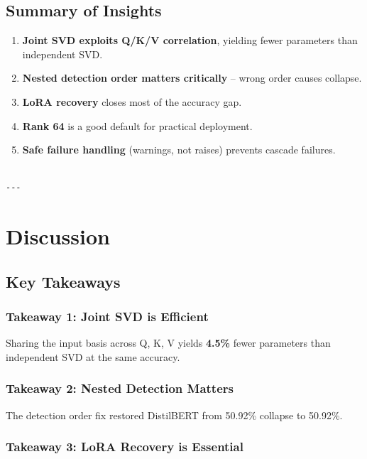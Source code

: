 \subsection{Summary of Insights}

\begin{enumerate}
\item \textbf{Joint SVD exploits Q/K/V correlation}, yielding fewer parameters than
  independent SVD.
\item \textbf{Nested detection order matters critically} -- wrong order causes collapse.
\item \textbf{LoRA recovery} closes most of the accuracy gap.
\item \textbf{Rank 64} is a good default for practical deployment.
\item \textbf{Safe failure handling} (warnings, not raises) prevents cascade failures.
\end{enumerate}
\begin{lstlisting}

---
\end{lstlisting}

\section{Discussion}

\subsection{Key Takeaways}

\subsubsection{Takeaway 1: Joint SVD is Efficient}

Sharing the input basis across Q, K, V yields \textbf{4.5\%} fewer 
parameters than independent SVD at the same accuracy.

\subsubsection{Takeaway 2: Nested Detection Matters}

The detection order fix restored DistilBERT from 50.92\% collapse to 
50.92\%.

\subsubsection{Takeaway 3: LoRA Recovery is Essential}

